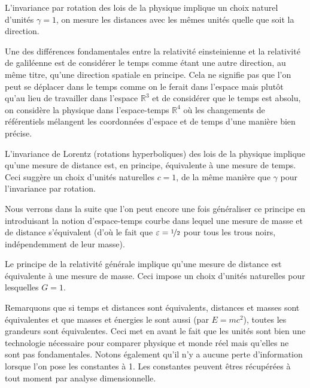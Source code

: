 \documentclass[a4paper,11pt]{report}
\begin{document}
        \begin{leftbar}
            L'invariance par rotation des lois de la physique implique un choix naturel d'unités $\gamma = 1$, on mesure les distances avec les mêmes unités quelle que soit la direction.
        \end{leftbar}
        
        Une des différences fondamentales entre la relativité einsteinienne et la relativité de galiléenne est de considérer le temps comme étant une autre direction, au même titre, qu'une direction spatiale en principe. Cela ne signifie pas que l'on peut se déplacer dans le temps comme on le ferait dans l'espace mais plutôt qu'au lieu de travailler dans l'espace $\mathbb{R}^3$ et de considérer que le temps est absolu, on considère la physique dans l'espace-temps $\mathbb{R}^4$ où les changements de référentiels mélangent les coordonnées d'espace et de temps d'une manière bien précise.
        
        \begin{leftbar}
            L'invariance de Lorentz (rotations hyperboliques) des lois de la physique implique qu'une mesure de distance est, en principe, équivalente à une mesure de temps. Ceci suggère un choix d'unités naturelles $c=1$, de la même manière que $\gamma$ pour l'invariance par rotation.
        \end{leftbar}
        
        Nous verrons dans la suite que l'on peut encore une fois généraliser ce principe en introduisant la notion d'espace-temps courbe dans lequel une mesure de masse et de distance s'équivalent (d'où le fait que $\varepsilon = \nicefrac{1}{2}$ pour tous les trous noirs, indépendemment de leur masse).
        
        \begin{leftbar}
            Le principe de la relativité générale implique qu'une mesure de distance est équivalente à une mesure de masse. Ceci impose un choix d'unités naturelles pour lesquelles $G = 1$.
        \end{leftbar}
        
        Remarquons que si temps et distances sont équivalents, distances et masses sont équivalentes et que masses et énergies le sont aussi (par $E = mc^2$), toutes les grandeurs sont équivalentes. Ceci met en avant le fait que les unités sont bien une technologie nécessaire pour comparer physique et monde réel mais qu'elles ne sont pas fondamentales. Notons également qu'il n'y a aucune perte d'information lorsque l'on pose les constantes à 1. Les constantes peuvent êtres récupérées à tout moment par analyse dimensionnelle.
\end{document}
